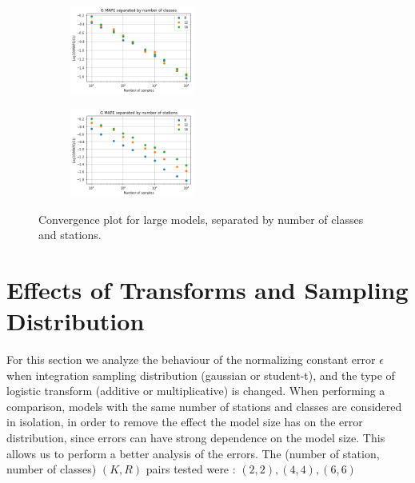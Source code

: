 \begin{figure}[!htb]
\begin{center}
\begin{subfigure}
    \centering
    \includegraphics[width=0.45\textwidth]{Chap6_EvaluationAndAnalysis/images/ConvergenceNumberOfClasses_LM_meanerr.png}
\end{subfigure}
\begin{subfigure}
    \centering
    \includegraphics[width=0.45\textwidth]{Chap6_EvaluationAndAnalysis/images/ConvergenceNumberOfStations_LM_meanerr.png}
\end{subfigure}
\caption{Convergence plot for large models, separated by number of classes and stations.}
\label{fig:ClassSeparatedConvergence_LM_meanerr}
\end{center}
\end{figure}

\section{Effects of Transforms and Sampling Distribution}\label{sec:Transforms_and_Distributions}

For this section we analyze the behaviour of the normalizing constant error \(\epsilon\) when integration sampling distribution (gaussian or student-t), and the type of logistic transform (additive or multiplicative) is changed. When performing a comparison, models with the same number of stations and classes are considered in isolation, in order to remove the effect the model size has on the error distribution, since errors can have strong dependence on the model size. This allows us to perform a better analysis of the errors. The (number of station, number of classes) \((K,R)\) pairs tested were : \((2,2), (4,4), (6,6)\)

